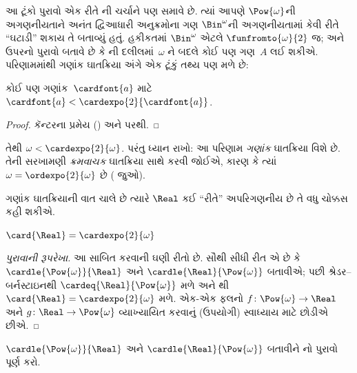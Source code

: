 આ ટૂંકો પુરાવો એક રીતે
ની ચર્ચાને પણ સમાવે છે.
ત્યાં આપણે $\Pow{\omega}$ની અગણનીયતાને અનંત દ્વિઆધારી
અનુક્રમોના ગણ $\Bin^\omega$ની અગણનીયતામાં કેવી રીતે
``ઘટાડી'' શકાય તે બતાવ્યું હતું. હકીકતમાં
$\Bin^{\omega}$ એટલે $\funfromto{\omega}{2}$ જ;
અને ઉપરનો પુરાવો બતાવે છે કે
ની દલીલમાં~$\omega$
ને બદલે કોઈ પણ ગણ~$A$ લઈ શકીએ. પરિણામમાંથી
ગણાંક ઘાતક્રિયા અંગે એક ટૂંકું તથ્ય પણ મળે છે:

\begin{cor}
કોઈ પણ ગણાંક~$\cardfont{a}$ માટે
$\cardfont{a} < \cardexpo{2}{\cardfont{a}}$.
\end{cor}

\begin{proof}
કૅન્ટરના પ્રમેય
() અને
 પરથી.
\end{proof}
\noindent
તેથી $\omega < \cardexpo{2}{\omega}$.
પરંતુ ધ્યાન રાખો: આ પરિણામ \emph{ગણાંક}
ઘાતક્રિયા વિશે છે. તેની સરખામણી \emph{ક્રમવાચક}
ઘાતક્રિયા સાથે કરવી જોઈએ, કારણ કે ત્યાં
$\omega = \ordexpo{2}{\omega}$ છે
( જુઓ).

ગણાંક ઘાતક્રિયાની વાત ચાલે છે ત્યારે
$\Real$ કઈ ``રીતે'' અપરિગણનીય છે તે
વધુ ચોક્કસ કહી શકીએ.

\begin{thm}
$\card{\Real} = \cardexpo{2}{\omega}$
\end{thm}

\begin{proof}[પુરાવાની રૂપરેખા]
આ સાબિત કરવાની ઘણી રીતો છે. સૌથી સીધી રીત એ
છે કે $\cardle{\Pow{\omega}}{\Real}$ અને
$\cardle{\Real}{\Pow{\omega}}$ બતાવીએ; પછી
શ્રેડર--બર્નસ્ટાઇનથી $\cardeq{\Real}{\Pow{\omega}}$
મળે અને 
થી $\card{\Real} = \cardexpo{2}{\omega}$ મળે.
એક-એક ફલનો $f \colon \Pow{\omega} \to \Real$
અને $g \colon \Real \to \Pow{\omega}$ વ્યાખ્યાયિત
કરવાનું (ઉપયોગી) સ્વાધ્યાય માટે છોડીએ છીએ.
\end{proof}

\begin{prob}
$\cardle{\Pow{\omega}}{\Real}$ અને
$\cardle{\Real}{\Pow{\omega}}$ બતાવીને
નો
પુરાવો પૂર્ણ કરો.
\end{prob}
\endgroup

\begingroup
\makeatletter{}\makeatother


